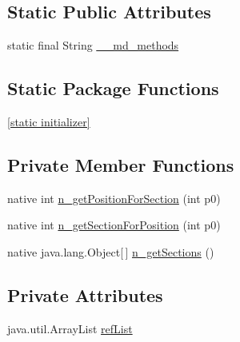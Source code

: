 \subsection*{Static Public Attributes}
\begin{CompactItemize}
\item 
static final String \hyperlink{classmd5b60ffeb829f638581ab2bb9b1a7f4f3f_1_1_grouped_list_view_adapter_e887eb8c51f6679bbffdba979210ff48}{\_\-\_\-md\_\-methods}
\end{CompactItemize}
\subsection*{Static Package Functions}
\begin{CompactItemize}
\item 
\hyperlink{classmd5b60ffeb829f638581ab2bb9b1a7f4f3f_1_1_grouped_list_view_adapter_fe703df4896b7de21a64f688845fb595}{\mbox{[}static initializer\mbox{]}}
\end{CompactItemize}
\subsection*{Private Member Functions}
\begin{CompactItemize}
\item 
native int \hyperlink{classmd5b60ffeb829f638581ab2bb9b1a7f4f3f_1_1_grouped_list_view_adapter_900f0e8b77bd057257fff593067b5b58}{n\_\-getPositionForSection} (int p0)
\item 
native int \hyperlink{classmd5b60ffeb829f638581ab2bb9b1a7f4f3f_1_1_grouped_list_view_adapter_97312d50b7b7c6c76aad3ff5ebeb224f}{n\_\-getSectionForPosition} (int p0)
\item 
native java.lang.Object\mbox{[}$\,$\mbox{]} \hyperlink{classmd5b60ffeb829f638581ab2bb9b1a7f4f3f_1_1_grouped_list_view_adapter_6f70ea09c24765f6072da5384b921aed}{n\_\-getSections} ()
\end{CompactItemize}
\subsection*{Private Attributes}
\begin{CompactItemize}
\item 
java.util.ArrayList \hyperlink{classmd5b60ffeb829f638581ab2bb9b1a7f4f3f_1_1_grouped_list_view_adapter_aa8849c73c487cac5b8a78f850930321}{refList}
\end{CompactItemize}


